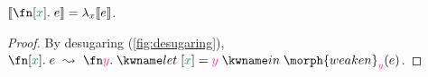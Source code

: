 \documentclass{rntz}\usepackage{fantasy}%
\begin{document}

\newcommand\weaken[2]{\morph{weaken}_{#2}({#1})}

\begin{lemma}\label{lem:lambox}
  \(\den{\fnof{\eboxd x} e} = \lambda_x\den{e}\).
\end{lemma}
\begin{proof}
  By desugaring (\cref{fig:desugaring}), $\fnof{\eboxd x} e \desugars
  \fnof{\freshvar y} \elet{\eboxd x = \freshvar y} \weaken{e}{\freshvar y}$. \XXX
\end{proof}


\end{document}
